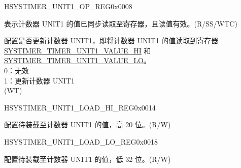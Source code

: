 \begin{register}{H}{SYSTIMER\_UNIT1\_OP\_REG}{0x0008}\label{regdesc:SYSTIMERUNIT1OPREG}
%
%
%
%
\regnewline%
\begin{regdesc}\begin{reglist}
\label{fielddesc:SYSTIMERTIMERUNIT1VALUEVALID}\item [SYSTIMER\_TIMER\_UNIT1\_VALUE\_VALID] 表示计数器 UNIT1 的值已同步读取至寄存器，且读值有效。(R/SS/WTC)
\label{fielddesc:SYSTIMERTIMERUNIT1UPDATE}\item [SYSTIMER\_TIMER\_UNIT1\_UPDATE] 配置是否更新计数器 UNIT1，即将计数器 UNIT1 的值读取到寄存器 \hyperref[fielddesc:SYSTIMERTIMERUNIT1VALUEHI]{SYSTIMER\_TIMER\_UNIT1\_VALUE\_HI} 和 \hyperref[fielddesc:SYSTIMERTIMERUNIT1VALUELO]{SYSTIMER\_TIMER\_UNIT1\_VALUE\_LO}。\\
0：无效 \\
1：更新计数器 UNIT1\\
(WT)
\end{reglist}\end{regdesc}
\end{register}


\begin{register}{H}{SYSTIMER\_UNIT1\_LOAD\_HI\_REG}{0x0014}\label{regdesc:SYSTIMERUNIT1LOADHIREG}
%
%
\regnewline%
\begin{regdesc}\begin{reglist}
\label{fielddesc:SYSTIMERTIMERUNIT1LOADHI}\item [SYSTIMER\_TIMER\_UNIT1\_LOAD\_HI] 配置待装载至计数器 UNIT1 的值，高 20 位。(R/W)
\end{reglist}\end{regdesc}
\end{register}


\begin{register}{H}{SYSTIMER\_UNIT1\_LOAD\_LO\_REG}{0x0018}\label{regdesc:SYSTIMERUNIT1LOADLOREG}
%
\regnewline%
\begin{regdesc}\begin{reglist}
\label{fielddesc:SYSTIMERTIMERUNIT1LOADLO}\item [SYSTIMER\_TIMER\_UNIT1\_LOAD\_LO] 配置待装载至计数器 UNIT1 的值，低 32 位。(R/W)
\end{reglist}\end{regdesc}
\end{register}


